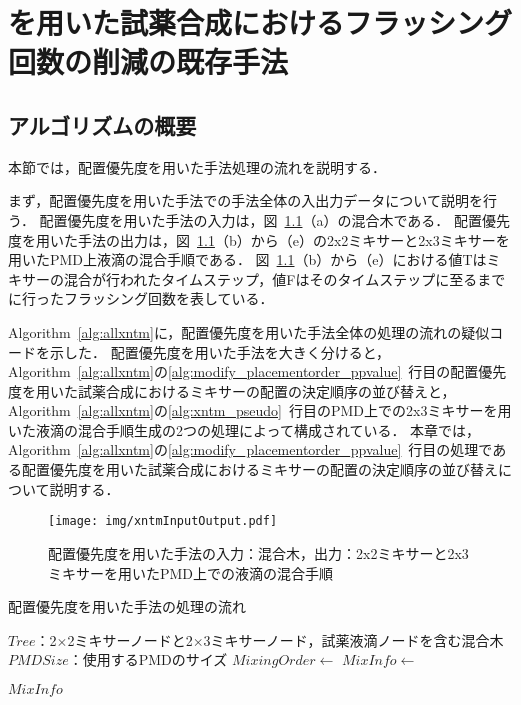\chapter{を用いた試薬合成におけるフラッシング回数の削減の既存手法}\label{sec:existing}

\section{アルゴリズムの概要}
本節では，配置優先度を用いた手法処理の流れを説明する．

まず，配置優先度を用いた手法での手法全体の入出力データについて説明を行う．
配置優先度を用いた手法の入力は，図~\ref{fig:xntm}（a）の混合木である．
配置優先度を用いた手法の出力は，図~\ref{fig:xntm}（b）から（e）の2x2ミキサーと2x3ミキサーを用いたPMD上液滴の混合手順である．
図~\ref{fig:xntm}（b）から（e）における値Tはミキサーの混合が行われたタイムステップ，値Fはそのタイムステップに至るまでに行ったフラッシング回数を表している．

Algorithm~\ref{alg:allxntm}に，配置優先度を用いた手法全体の処理の流れの疑似コードを示した．
配置優先度を用いた手法を大きく分けると，Algorithm~\ref{alg:allxntm}の\ref{alg:modify_placementorder_ppvalue}~行目の配置優先度を用いた試薬合成におけるミキサーの配置の決定順序の並び替えと，Algorithm~\ref{alg:allxntm}の\ref{alg:xntm_pseudo}~行目のPMD上での2x3ミキサーを用いた液滴の混合手順生成の2つの処理によって構成されている．
本章では，Algorithm~\ref{alg:allxntm}の\ref{alg:modify_placementorder_ppvalue}~行目の処理である配置優先度を用いた試薬合成におけるミキサーの配置の決定順序の並び替えについて説明する．

\begin{figure}[tbp]
 \centering\texttt{[image: img/xntmInputOutput.pdf]}
 \caption{配置優先度を用いた手法の入力：混合木，出力：2x2ミキサーと2x3ミキサーを用いたPMD上での液滴の混合手順}\label{fig:xntm}
\end{figure}


\begin{algorithm}[tbp]
 \caption{配置優先度を用いた手法の処理の流れ}\label{alg:allxntm}
 \begin{algorithmic}[1]
     \Require $\mathit{Tree}$：2$\times$2ミキサーノードと2$\times$3ミキサーノード，試薬液滴ノードを含む混合木
     \Require $\mathit{PMDSize}$：使用するPMDのサイズ
     \State $\mathit{MixingOrder} \gets$  \label{alg:modify_placementorder_ppvalue}
     \State $\mathit{MixInfo \gets}$  \label{alg:xntm_pseudo}

      \Return $\mathit{MixInfo}$
 \end{algorithmic}
\end{algorithm}

